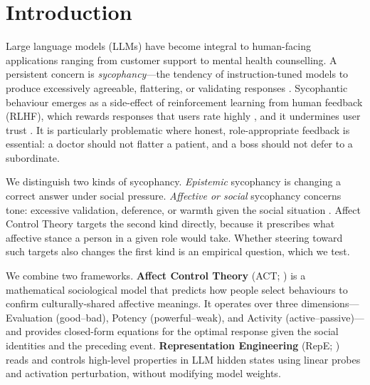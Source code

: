 \documentclass[letterpaper]{article} %
\begin{document}
\section{Introduction}

Large language models (LLMs) have become integral to human-facing applications ranging from customer support to mental health counselling. A persistent concern is \textit{sycophancy}---the tendency of instruction-tuned models to produce excessively agreeable, flattering, or validating responses \citep{sharma2024understanding, perez2023discovering, malmqvist2024sycophancy}. Sycophantic behaviour emerges as a side-effect of reinforcement learning from human feedback (RLHF), which rewards responses that users rate highly \citep{ouyang2022training, christiano2017deep}, and it undermines user trust \citep{sun2025friendly}. It is particularly problematic where honest, role-appropriate feedback is essential: a doctor should not flatter a patient, and a boss should not defer to a subordinate.

We distinguish two kinds of sycophancy. \textit{Epistemic} sycophancy is changing a correct answer under social pressure. \textit{Affective or social} sycophancy concerns tone: excessive validation, deference, or warmth given the social situation \citep{cheng2025elephant}. Affect Control Theory targets the second kind directly, because it prescribes what affective stance a person in a given role would take. Whether steering toward such targets also changes the first kind is an empirical question, which we test.

We combine two frameworks. \textbf{Affect Control Theory} (ACT; \citealt{heise2007expressive}) is a mathematical sociological model that predicts how people select behaviours to confirm culturally-shared affective meanings. It operates over three dimensions---Evaluation (good--bad), Potency (powerful--weak), and Activity (active--passive)---and provides closed-form equations for the optimal response given the social identities and the preceding event. \textbf{Representation Engineering} (RepE; \citealt{zou2023representation}) reads and controls high-level properties in LLM hidden states using linear probes and activation perturbation, without modifying model weights.
\end{document}
